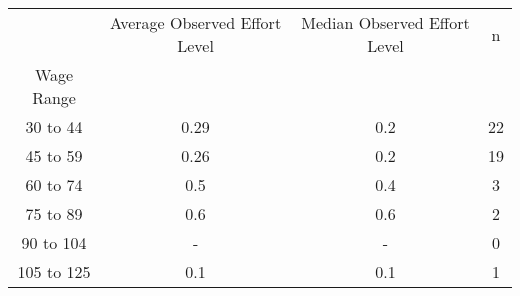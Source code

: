 \begin{tabular}{cccc}
\toprule
{} & Average Observed Effort Level & Median Observed Effort Level &   n \\
Wage Range &                               &                              &     \\
\midrule
30 to 44   &                          0.29 &                          0.2 &  22 \\
45 to 59   &                          0.26 &                          0.2 &  19 \\
60 to 74   &                           0.5 &                          0.4 &   3 \\
75 to 89   &                           0.6 &                          0.6 &   2 \\
90 to 104  &                             - &                            - &   0 \\
105 to 125 &                           0.1 &                          0.1 &   1 \\
\bottomrule
\end{tabular}
